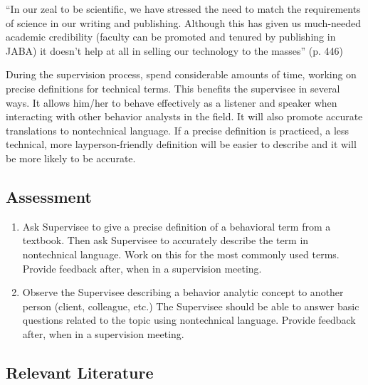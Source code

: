 ``In our zeal to be scientific, we have stressed the need to match the requirements of science in our writing and publishing. Although this has given us much-needed academic credibility (faculty can be promoted and tenured by publishing in JABA) it doesn't help at all in selling our technology to the masses'' (p. 446)

During the supervision process, spend considerable amounts of time, working on precise definitions for technical terms. This benefits the supervisee in several ways. It allows him/her to behave effectively as a listener and speaker when interacting with other behavior analysts in the field. It will also promote accurate translations to nontechnical language. If a precise definition is practiced, a less technical, more layperson-friendly definition will be easier to describe and it will be more likely to be accurate.
%
\subsection{Assessment}
\begin{enumerate}
\item Ask Supervisee to give a precise definition of a behavioral term from a textbook. Then ask Supervisee to accurately describe the term in nontechnical language. Work on this for the most commonly used terms. Provide feedback after, when in a supervision meeting.
\item Observe the Supervisee describing a behavior analytic concept to another person (client, colleague, etc.) The Supervisee should be able to answer basic questions related to the topic using nontechnical language. Provide feedback after, when in a supervision meeting.
\end{enumerate}
%
\subsection{Relevant Literature}
\begin{refsection}
\nocite{test,alang2017police,clayton2018black}
\printbibliography[heading=none]
\end{refsection}
